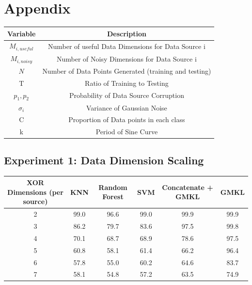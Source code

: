 \documentclass{article}
\begin{document}
\newpage
\section*{Appendix}


\begin{center}
\begin{tabular}{|c|c|}
\hline
\textbf{Variable} &\textbf{ Description}\\
\hline
\hline
$M_{i,useful}$ & Number of useful Data Dimensions for Data Source i\\
\hline
$M_{i, noisy}$ & Number of Noisy Dimensions for Data Source i\\
\hline
$N$ & Number of Data Points Generated (training and testing)\\
\hline
T & Ratio of Training to Testing \\
\hline
$p_1, p_2$ & Probability of Data Source Corruption\\
\hline
$\sigma_i$ & Variance of Gaussian Noise \\
\hline
C & Proportion of Data points in each class \\
\hline
k & Period of Sine Curve\\
\hline
\end{tabular}
\end{center}

\subsection*{Experiment 1: Data Dimension Scaling}

\begin{minipage}{\textwidth}
\centering
\begin{tabular}{|c| c| c| c| c| c|}
\hline
XOR Dimensions (per source) & KNN & Random Forest & SVM & Concatenate + GMKL & GMKL \\
\hline
2 & 99.0 & 96.6 & 99.0 & 99.9 & 99.9 \\
\hline
3 & 86.2 & 79.7 & 83.6 & 97.5 & 99.8 \\
\hline
4 & 70.1 & 68.7 & 68.9 & 78.6 & 97.5 \\
\hline
5 & 60.8 & 58.1 & 61.4 & 66.2 & 96.4 \\
\hline
6 & 57.8 & 55.0 & 60.2 & 64.6 & 83.7 \\
\hline
7 & 58.1 & 54.8 & 57.2 & 63.5 & 74.9 \\
\hline
\end{tabular}
\end{minipage}
\end{document}
